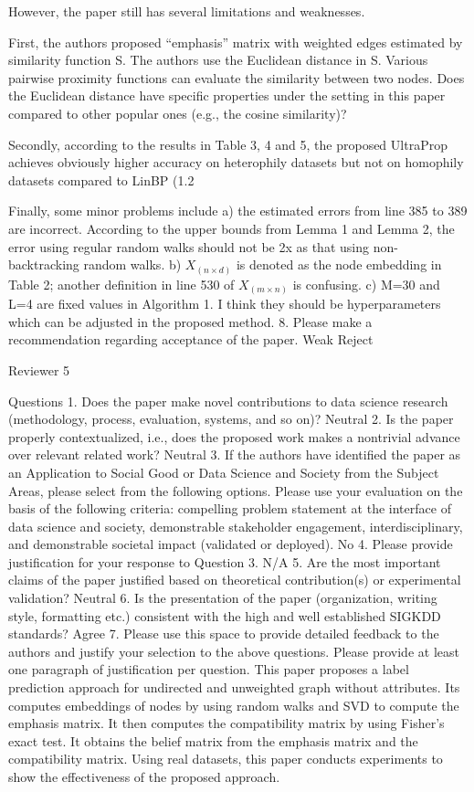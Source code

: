 However, the paper still has several limitations and weaknesses.

First, the authors proposed “emphasis” matrix with weighted edges estimated by similarity function S. The authors use the Euclidean distance in S. Various pairwise proximity functions can evaluate the similarity between two nodes. Does the Euclidean distance have specific properties under the setting in this paper compared to other popular ones (e.g., the cosine similarity)?

Secondly, according to the results in Table 3, 4 and 5, the proposed UltraProp achieves obviously higher accuracy on heterophily datasets but not on homophily datasets compared to LinBP (1.2%

Finally, some minor problems include a) the estimated errors from line 385 to 389 are incorrect. According to the upper bounds from Lemma 1 and Lemma 2, the error using regular random walks should not be 2x as that using non-backtracking random walks. b) $X_(n×d)$ is denoted as the node embedding in Table 2; another definition in line 530 of $X_(m×n)$ is confusing. c) M=30 and L=4 are fixed values in Algorithm 1. I think they should be hyperparameters which can be adjusted in the proposed method.
8. Please make a recommendation regarding acceptance of the paper.
Weak Reject

Reviewer 5

Questions
1. Does the paper make novel contributions to data science research (methodology, process, evaluation, systems, and so on)?
Neutral
2. Is the paper properly contextualized, i.e., does the proposed work makes a nontrivial advance over relevant related work?
Neutral
3. If the authors have identified the paper as an Application to Social Good or Data Science and Society from the Subject Areas, please select from the following options. Please use your evaluation on the basis of the following criteria: compelling problem statement at the interface of data science and society, demonstrable stakeholder engagement, interdisciplinary, and demonstrable societal impact (validated or deployed).
No
4. Please provide justification for your response to Question 3.
N/A
5. Are the most important claims of the paper justified based on theoretical contribution(s) or experimental validation?
Neutral
6. Is the presentation of the paper (organization, writing style, formatting etc.) consistent with the high and well established SIGKDD standards?
Agree
7. Please use this space to provide detailed feedback to the authors and justify your selection to the above questions. Please provide at least one paragraph of justification per question.
This paper proposes a label prediction approach for undirected and unweighted graph without attributes. Its computes embeddings of nodes by using random walks and SVD to compute the emphasis matrix. It then computes the compatibility matrix by using Fisher’s exact test. It obtains the belief matrix from the emphasis matrix and the compatibility matrix. Using real datasets, this paper conducts experiments to show the effectiveness of the proposed approach.

